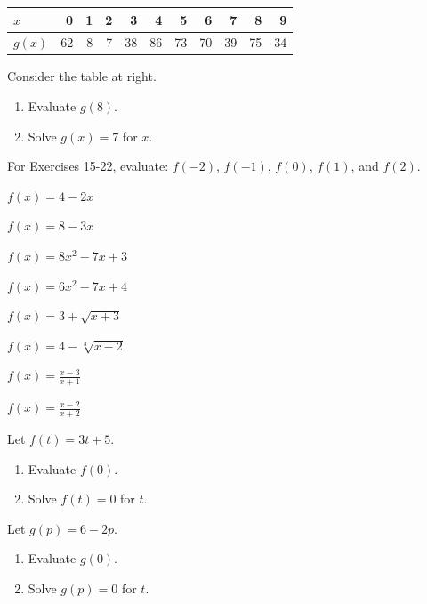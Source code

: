 \begin{enumerate}
\begin{minipage}{\linewidth}
\begin{table}
    \centering
    \vspace{-12pt}
    \begin{longtable}[]{@{}lrrrrrrrrrr@{}}
    \toprule
    $x$ & 0 & 1 & 2 & 3 & 4 & 5 & 6 & 7 & 8 & 9\tabularnewline
    \midrule
    \endhead
    $g(x)$ & 62 & 8 & 7 & 38 & 86 & 73 & 70 & 39 & 75 & 34\tabularnewline
    \bottomrule
    \end{longtable}
\end{table}

\item  Consider the table at right.
\begin{enumerate}
    \item Evaluate $g(8)$.
    \item Solve $g(x) = 7$ for $x$.
\end{enumerate}
\end{minipage}

\vspace{24pt}

\noindent For Exercises 15-22, evaluate: $f(-2)$, $f(-1)$, $f(0)$, $f(1)$, and $f(2)$.

\item $f(x) = 4 - 2 x$
\item $f(x) = 8-3x$
\item $f(x) = 8x^2 - 7x + 3$
\item $f(x) = 6x^2 - 7x + 4$
\item $f(x) = 3 + \sqrt{x+3}$
\item $f(x) = 4 - \sqrt[3]{x-2}$
\item $f(x) = \frac{x-3}{x+1}$
\item $f(x) = \frac{x-2}{x+2}$

\item Let $f(t) = 3t+5$.
\begin{enumerate}
    \item Evaluate $f(0)$.
    \item Solve $f(t) = 0$ for $t$.
\end{enumerate}

\item Let $g(p) = 6-2p$.
\begin{enumerate}
    \item Evaluate $g(0)$.
    \item Solve $g(p) = 0$ for $t$.
\end{enumerate}


\end{enumerate}

